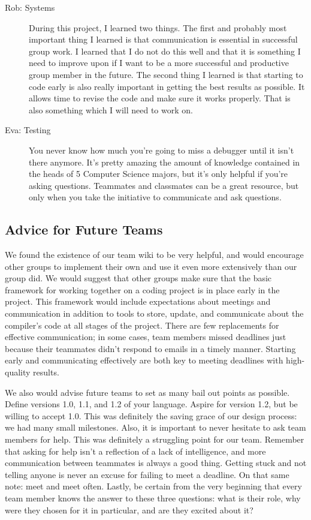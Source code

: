 \begin{description}
\item[Rob: Systems] During this project, I learned two things. The
  first and probably most important thing I learned is that
  communication is essential in successful group work. I learned
  that I do not do this well and that it is something I need to
  improve upon if I want to be a more successful and productive group
  member in the future. The second thing I learned is that starting to
  code early is also really important in getting the best results as
  possible. It allows time to revise the code and make sure it works
  properly. That is also something which I will need to work on.

\item[Eva: Testing] You never know how much you're going to miss a
  debugger until it isn't there anymore.  It's pretty amazing the
  amount of knowledge contained in the heads of 5 Computer Science
  majors, but it's only helpful if you're asking questions.  Teammates
  and classmates can be a great resource, but only when you take the
  initiative to communicate and ask questions.
\end{description}

\subsection{Advice for Future Teams}
We found the existence of our team wiki to be very helpful, and would
encourage other groups to implement their own and use it even more
extensively than our group did. We would suggest that other groups
make sure that the basic framework for working together on a coding
project is in place early in the project. This framework would include
expectations about meetings and communication in addition to tools to
store, update, and communicate about the compiler's code at all stages
of the project. There are few replacements for effective
communication; in some cases, team members missed deadlines just
because their teammates didn't respond to emails in a timely
manner. Starting early and communicating effectively are both key to
meeting deadlines with high-quality results.

We also would advise future teams to set as many bail out points as
possible. Define versions 1.0, 1.1, and 1.2 of your language. Aspire
for version 1.2, but be willing to accept 1.0. This was definitely the
saving grace of our design process: we had many small
milestones. Also, it is important to never hesitate to ask team
members for help. This was definitely a struggling point for our
team. Remember that asking for help isn't a reflection of a lack of
intelligence, and more communication between teammates is always a
good thing. Getting stuck and not telling anyone is never an excuse
for failing to meet a deadline. On that same note: meet and meet
often. Lastly, be certain from the very beginning that every team
member knows the answer to these three questions: what is their role,
why were they chosen for it in particular, and are they excited about
it?

